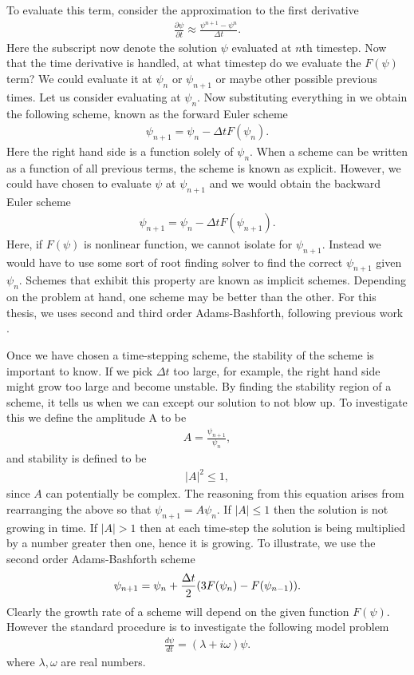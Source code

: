 To evaluate this term, consider the approximation to the first derivative \cite{durran}
\begin{align}
\frac{\partial \psi}{\partial t} \approx  \frac{\psi^{n+1}-\psi^{n}}{\Delta t}.
\end{align}
Here the subscript now denote the solution $\psi$ evaluated at $n$th timestep. Now that the time derivative is handled, at what timestep do we evaluate the $F(\psi)$ term? We could evaluate it at $\psi_{n}$ or $\psi_{n+1}$ or maybe other possible previous times. Let us consider evaluating at $\psi_{n}$. Now substituting everything in we obtain the following scheme, known as the forward Euler scheme \cite{durran}
\begin{align}
\psi_{n+1} = \psi_{n} - \Delta t F(\psi_{n}).
\end{align} 
Here the right hand side is a function solely of $\psi_{n}$. When a scheme can be written as a function of all previous terms, the scheme is known as explicit. However, we could have chosen to evaluate $\psi$ at $\psi_{n+1}$ and we would obtain the backward Euler scheme \cite{durran} 
\begin{align}
\psi_{n+1} = \psi_{n} - \Delta t F(\psi_{n+1}).
\end{align} 
Here, if $F(\psi)$ is nonlinear function, we cannot isolate for $\psi_{n+1}$. Instead we would have to use some sort of root finding solver to find the correct $\psi_{n+1}$ given $\psi_{n}$. Schemes that exhibit this property are known as implicit schemes. Depending on the problem at hand, one scheme may be better than the other. For this thesis, we uses second and third order Adams-Bashforth, following previous work \cite{bc2000c,waitesmol2008}.

Once we have chosen a time-stepping scheme, the stability of the scheme is important to know. If we pick $\Delta t$ too large, for example, the right hand side might grow too large and become unstable. By finding the stability region of a scheme, it tells us when we can except our solution to not blow up. To investigate this we define the amplitude A to be
\begin{align}
A = \frac{\psi_{n+1}}{\psi_{n}},
\end{align}
and stability is defined to be 
\begin{align}
|A|^{2} \le 1,
\end{align}
since $A$ can potentially be complex. The reasoning from this equation arises from rearranging the above so that $\psi_{n+1}=A\psi_{n}$. If $|A|\le 1$ then the solution is not growing in time. If $|A|>1$ then at each time-step the solution is being multiplied by a number greater then one, hence it is growing.  To illustrate, we use the second order Adams-Bashforth scheme \cite{durran}
\begin{align}
\psi_{n+1} = \psi_{n} + \frac{\Delta t}{2}(3F(\psi_{n}) - F(\psi_{n-1})).
\end{align} 
Clearly the growth rate of a scheme will depend on the given function $F(\psi)$. However the standard procedure is to investigate the following model problem \cite{durran}
\begin{align}
\frac{d\psi}{dt} =  (\lambda + i\omega)\psi.
\end{align}
where $\lambda,\omega$ are real numbers. 

